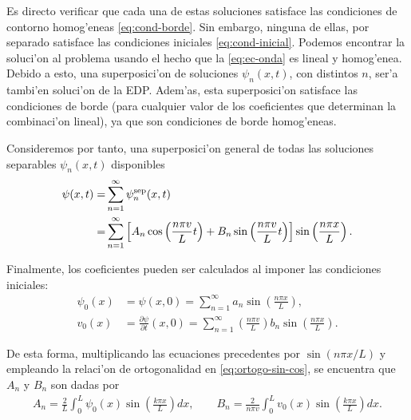 Es directo verificar que cada una de estas soluciones satisface las condiciones de contorno homog'eneas \eqref{eq:cond-borde}. Sin embargo, ninguna de ellas, por separado satisface las condiciones iniciales \eqref{eq:cond-inicial}. Podemos encontrar la soluci'on al problema usando el hecho que la \eqref{eq:ec-onda} es lineal y homog'enea. Debido a esto, una superposici'on de soluciones $\psi_{n}(x,t)$, con distintos $n$, ser'a tambi'en soluci'on de la EDP. Adem'as, esta superposici'on satisface las condiciones de borde (para cualquier valor de los coeficientes que determinan la combinaci'on lineal), ya que son condiciones de borde homog'eneas.

Consideremos por tanto, una superposici'on general de todas las soluciones separables $\psi_{n}(x,t)$ disponibles
\begin{align}
\psi(x,t)=&\sum_{n=1}^{\infty}\psi^{\rm sep}_{n}(x,t)\\
=&\sum_{n=1}^{\infty}\left[A_{n}\cos\left(\frac{n \pi v}{L}t\right)+B_{n}\sin\left(\frac{n \pi v}{L}t\right)\right] \sin\left(\frac{n\pi x}{L}\right).
\end{align}

Finalmente, los coeficientes pueden ser calculados al imponer las condiciones iniciales:
\begin{align}
\psi_{0}(x) &= \psi(x,0)=\sum_{n=1}^{\infty}a_{n}\sin\left(\frac{n \pi x}{L}\right),\label{eq:psi0}\\
v_{0}(x) &= \frac{\partial \psi}{\partial t}(x,0)=\sum_{n=1}^{\infty}\left( \frac{n \pi v}{L}\right) b_{n}\sin\left( \frac{n \pi x}{L}\right).\label{eq:v0}
\end{align}

De esta forma, multiplicando las ecuaciones precedentes por $\sin(n\pi x/L)$ y empleando la relaci'on de ortogonalidad en \eqref{eq:ortogo-sin-cos}, se encuentra que $A_{n}$ y $B_{n}$ son dadas por
\begin{align}
A_{n}=\frac{2}{L}\int_{0}^{L} \psi_{0}(x)\sin\left(\frac{k\pi x}{L}\right)dx, \qquad 
B_{n}=\frac{2}{n \pi v}\int_{0}^{L} v_{0}(x)\sin\left(\frac{k\pi x}{L}\right)dx.
\end{align}

